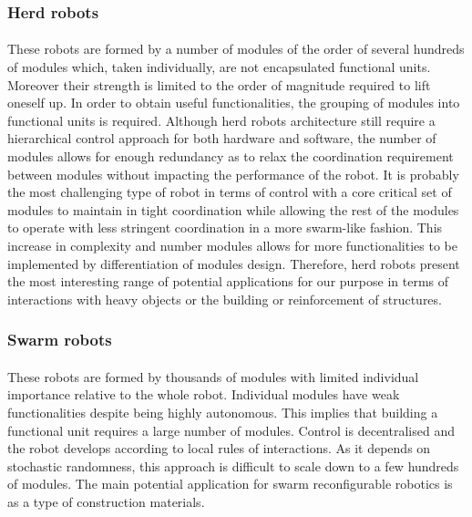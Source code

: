 \subsubsection{Herd robots}
\paragraph{}These robots are formed by a number of modules of the order of several hundreds of modules which,  taken individually, are not encapsulated functional units. Moreover their strength is limited to the order of magnitude required to lift oneself up. In order to obtain useful functionalities, the grouping of modules into functional units is required. Although herd robots architecture still require a hierarchical control approach for both hardware and software, the number of modules allows for enough redundancy as to relax the coordination requirement between modules without impacting the performance of the robot. It is probably the most challenging type of robot in terms of control with a core critical set of modules to maintain in tight coordination while allowing the rest of the modules to operate with less stringent coordination in a more swarm-like fashion. This increase in complexity and number modules allows for more functionalities to be implemented by differentiation of modules design. Therefore, herd robots present the most interesting range of potential applications for our purpose in terms of interactions with heavy objects or the building or reinforcement of structures. 
\subsubsection{Swarm robots}
\paragraph{}These robots are formed by thousands of modules with limited individual importance relative to the whole robot. Individual modules have weak functionalities despite being highly autonomous. This implies that building a functional unit requires a large number of modules. Control is decentralised and the robot develops according to local rules of interactions. As it depends on stochastic randomness, this approach is difficult to scale down to a few hundreds of modules. The main potential application for swarm reconfigurable robotics is as a type of construction materials.
